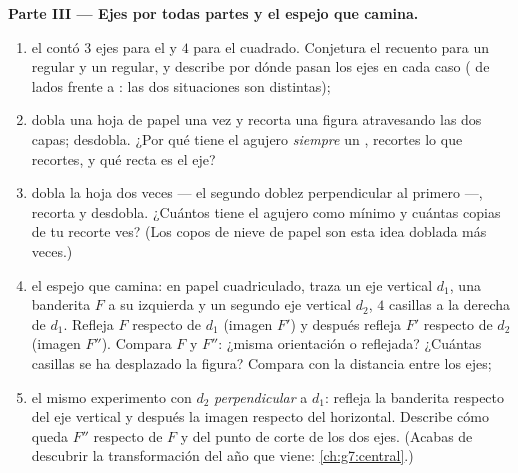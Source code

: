 \begin{problem}
\medskip
\noindent\textbf{Parte III --- Ejes por todas partes y el espejo que
camina.}
\begin{enumerate}[resume]
  \item el  contó $3$ ejes para el
         y $4$ para el cuadrado. Conjetura
        el recuento para un  regular y un  regular,
        y describe por dónde pasan los ejes en cada caso ( de lados frente a : las dos situaciones
        son distintas);
  \item dobla una hoja de papel una vez y recorta una figura atravesando las dos
        capas; desdobla. ¿Por qué tiene el agujero \emph{siempre} un
        , recortes lo que recortes, y qué recta es
        el eje?
  \item dobla la hoja dos veces --- el segundo doblez perpendicular
        al primero ---, recorta y desdobla. ¿Cuántos  tiene el agujero como mínimo y cuántas
        copias de tu recorte ves? (Los copos de nieve de papel son
        esta idea doblada más veces.)
  \item el espejo que camina: en papel cuadriculado, traza un eje vertical
        $d_1$, una banderita $F$ a su izquierda y un segundo
        eje vertical $d_2$, $4$ casillas a la derecha de $d_1$.
        Refleja $F$ respecto de $d_1$ (imagen $F'$) y después refleja
        $F'$ respecto de $d_2$ (imagen $F''$). Compara $F$ y $F''$:
        ¿misma orientación o reflejada? ¿Cuántas casillas se ha
        desplazado la figura? Compara con la distancia entre los
        ejes;
  \item el mismo experimento con $d_2$ \emph{perpendicular} a
        $d_1$: refleja la banderita respecto del eje vertical y después
        la imagen respecto del horizontal. Describe cómo queda $F''$
        respecto de $F$ y del punto de corte de los
        dos ejes. (Acabas de descubrir la transformación del año
        que viene: \cref{ch:g7:central}.)
\end{enumerate}
\end{problem}
